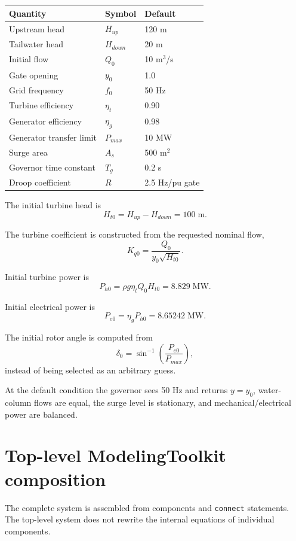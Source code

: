 \documentclass[11pt,a4paper]{article}
\begin{document}
\begin{center}
\begin{tabular}{lll}
\toprule
Quantity & Symbol & Default \\
\midrule
Upstream head & \(H_{up}\) & 120 m \\
Tailwater head & \(H_{down}\) & 20 m \\
Initial flow & \(Q_0\) & 10 m$^3$/s \\
Gate opening & \(y_0\) & 1.0 \\
Grid frequency & \(f_0\) & 50 Hz \\
Turbine efficiency & \(\eta_t\) & 0.90 \\
Generator efficiency & \(\eta_g\) & 0.98 \\
Generator transfer limit & \(P_{max}\) & 10 MW \\
Surge area & \(A_s\) & 500 m$^2$ \\
Governor time constant & \(T_g\) & 0.2 s \\
Droop coefficient & \(R\) & 2.5 Hz/pu gate \\
\bottomrule
\end{tabular}
\end{center}

The initial turbine head is
\[
H_{t0}=H_{up}-H_{down}=100\;\mathrm{m}.
\]

The turbine coefficient is constructed from the requested nominal flow,
\[
K_{q0}
=
\frac{Q_0}
{y_0\sqrt{H_{t0}}}.
\]

Initial turbine power is
\[
P_{h0}
=
\rho g\eta_tQ_0H_{t0}
=
8.829\;\mathrm{MW}.
\]

Initial electrical power is
\[
P_{e0}
=
\eta_gP_{h0}
=
8.65242\;\mathrm{MW}.
\]

The initial rotor angle is computed from
\[
\delta_0
=
\sin^{-1}
\left(
\frac{P_{e0}}{P_{max}}
\right),
\]
instead of being selected as an arbitrary guess.

At the default condition the governor sees 50 Hz and returns \(y=y_0\), water-column flows are equal, the surge level is stationary, and mechanical/electrical power are balanced.

\section{Top-level ModelingToolkit composition}
The complete system is assembled from components and \texttt{connect} statements. The top-level system does not rewrite the internal equations of individual components.
\end{document}
